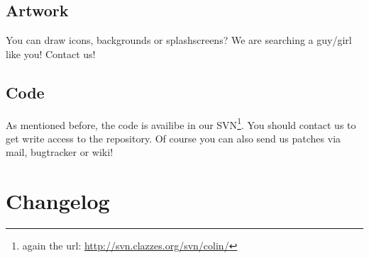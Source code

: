 \documentclass[a4paper,11pt]{report}
\begin{document}
\section{Artwork}
You can draw icons, backgrounds or splashscreens? We are searching a guy/girl like you! Contact us!

\section{Code}
As mentioned before, the code is availibe in our SVN\footnote{again the url: \url{http://svn.clazzes.org/svn/colin/}}. You should contact us to get write access to the repository. Of course you can also send us patches via mail, bugtracker or wiki!

\chapter{Changelog}




%
\end{document}
